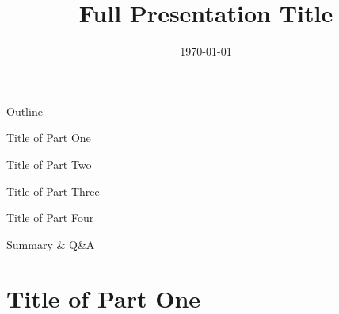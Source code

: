 \documentclass[aspectratio=169,10pt,xcolor=table]{beamer}
\title[Short Title]{Full Presentation Title}
\subtitle{}
\author{}
\institute{}
\date{\today}
\begin{document}
\maketitle

\begin{frame}{Outline}
\large\datafont
\renewcommand{\baselinestretch}{1.8}\selectfont

\makebox[2.4em][l]{\textcolor{maincolor}{01}} Title of Part One

\makebox[2.4em][l]{\textcolor{maincolor}{02}} Title of Part Two

\makebox[2.4em][l]{\textcolor{maincolor}{03}} Title of Part Three

\makebox[2.4em][l]{\textcolor{maincolor}{04}} Title of Part Four

\makebox[2.4em][l]{\textcolor{maincolor}{05}} Summary \& Q\&A
\end{frame}

\section{Title of Part One}

\sectionframe
\end{document}
